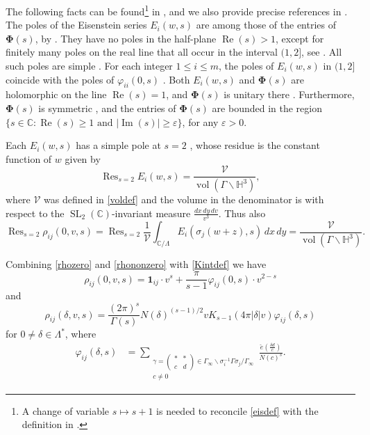 \documentclass[12pt,reqno]{amsart}
\numberwithin{equation}{section}
\renewcommand{\Im}{\operatorname{Im}}
\renewcommand{\Re}{\operatorname{Re}}
\newcommand{\C}{\mathbb{C}}
\DeclareMathOperator*{\Res}{Res}
\DeclareMathOperator{\vol}{vol}
\renewcommand{\pmatrix}[4]{\left(\begin{smallmatrix}#1 & #2 \\ #3 & #4\end{smallmatrix}\right)}
\begin{document}
The following facts can be found\footnote{A change of variable $s \mapsto s+1$ is needed to reconcile \eqref{eisdef} with the definition in \cite[\S 3.2, (2.5)]{EGM}.} in \cite[\S 6.1, Theorem 1.11]{EGM}, and we also provide precise references in \cite{SarCoh}. The poles of the Eisenstein series $E_{i}(w,s)$ are among those of the entries of $\boldsymbol{\Phi}(s)$, by \cite[Corollary 1.66]{SarCoh}. They have no poles in the half-plane $\Re(s)>1$, except for finitely many poles on the real line that all occur in the interval $(1,2]$, see \cite[Proposition 1.56]{SarCoh}. All such poles are simple \cite[Corollary 1.68]{SarCoh}.  For each integer $1\leq i\leq m$, the poles of $E_{i}(w,s)$ in $(1,2]$ coincide with the poles of $\varphi_{i i}(0, s)$ \cite[\S 6.1, Theorem 1.11 (2, 4)]{EGM}. Both $E_{i}(w,s)$ and $\boldsymbol{\Phi}(s)$ are holomorphic on the line $\Re(s)=1$, and $\boldsymbol{\Phi}(s)$ is unitary there \cite[Corollary 1.65]{SarCoh}. Furthermore, $\boldsymbol{\Phi}(s)$ is symmetric \cite[Corollary 1.64]{SarCoh}, and the entries of $\boldsymbol{\Phi}(s)$ are bounded \cite[\S 6.3, Lemma 3.5]{EGM} in the region $\{ s \in \mathbb{C} : \Re(s) \geq 1 \text{ and } |{\Im(s)}| \geq \varepsilon \}$, for any $\varepsilon > 0$. 

Each $E_{i}(w,s)$ has a simple pole at $s=2$ \cite[Theorem 1.58]{SarCoh}, whose residue is the constant function of $w$ given by
\begin{equation} \label{constantres}
    \Res_{s=2} E_{i}(w,s)=\frac{\mathcal{V} }{\vol( \Gamma \backslash \mathbb{H}^3)},
\end{equation}
where $\mathcal{V}$ was defined in \eqref{voldef} and the volume in the denominator is with respect to the $\operatorname{SL}_2(\mathbb{C})$-invariant measure $\frac{dx\, dy\, dv}{v^3}$. Thus also
\begin{equation}\label{rhores}
    \Res_{s=2} \rho_{ij}(0, v, s) = \Res_{s=2} \frac{1}{\mathcal{V}}\int_{\C / \Lambda} E_i(\sigma_j (w+z), s) \, dx \, dy= \frac{\mathcal{V} }{\vol( \Gamma \backslash \mathbb{H}^3)}.
\end{equation}

Combining \eqref{rhozero} and \eqref{rhononzero} with \eqref{Kintdef} we have  
\begin{equation} \label{constterm}
    \rho_{i j}(0,v,s)=\mathbf{1}_{i j} \cdot v^s+ \frac{\pi}{s-1} \varphi_{i j}(0,s) \cdot v^{2-s}
\end{equation}
and
\begin{equation} \label{rhodeltatriv}
    \rho_{i j}(\delta,v,s)=\frac{(2 \pi)^s}{\Gamma(s)} N(\delta)^{(s-1)/2} v K_{s-1}(4 \pi |{\delta}|v)  \varphi_{i j}(\delta,s)
\end{equation}
for $0 \neq \delta \in \Lambda^*$, where 
\begin{align}\label{varphidef}
    \varphi_{i j}(\delta,s) &= \sum_{\substack{ \gamma=\pmatrix {*} {*} {c} {d} \in \Gamma_{\infty} \backslash \sigma_{i}^{-1} \Gamma \sigma_{j} / \Gamma_{\infty} \\ c \neq 0 } } \frac{\check{e}(\frac{\delta d}{c}) }{N(c)^s}.
\end{align}
\end{document}
